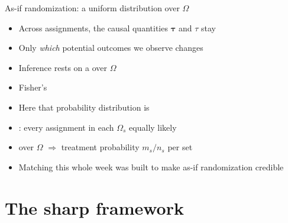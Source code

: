 \documentclass[table, xcolor = {dvipsnames}, 9pt]{beamer}
\theoremstyle{plain}
\newcommand{\mh}[1]{{\color{magenta}{#1}}}
\begin{document}
\begin{frame}[t]{As-if randomization: a uniform distribution over $\Omega$}
\vfill
\begin{itemize} \vfill
\item Across assignments, the causal quantities $\bm{\tau}$ and $\tau$ stay \mh{fixed} \vfill
\item Only \emph{which} potential outcomes we observe changes \vfill
\item Inference rests on a \mh{probability distribution} over $\Omega$ \vfill
\item[] Fisher's \mh{``reasoned basis''} \citep[p.~14]{fisher1935} \vfill
\item Here that probability distribution is \mh{unknown} \vfill
\item \mh{As-if randomization}: every assignment in each $\Omega_s$ equally likely \vfill
\item[] \mh{Uniform} over $\Omega$ $\Rightarrow$ treatment probability $m_s / n_s$ per set \vfill
\item Matching this whole week was built to make as-if randomization credible \vfill
\end{itemize} \vfill
\end{frame}
\section{The sharp framework}
\end{document}

